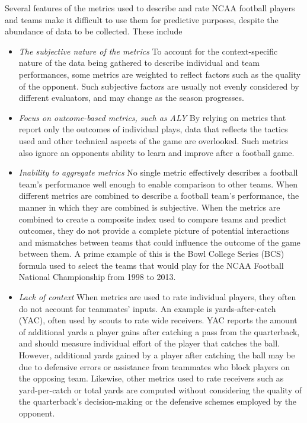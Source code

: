 \documentclass[sigconf]{acmart}
\begin{document}
Several features of the metrics used to describe and rate NCAA football players and teams make it difficult to use them for predictive purposes, despite the abundance of data to be collected. These include
\begin{itemize}
\item \textit{The subjective nature of the metrics}
\subitem To account for the context-specific nature of the data being gathered to describe individual and team performances, some metrics are weighted to reflect factors such as the quality of the opponent. Such subjective factors are usually not evenly considered by different evaluators, and may change as the season progresses.
\item \textit{Focus on outcome-based metrics, such as ALY}
\subitem By relying on metrics that report only the outcomes of individual plays, data that reflects the tactics used and other technical aspects of the game are overlooked. Such metrics also ignore an opponents ability to learn and improve after a football game.
\item \textit{Inability to aggregate metrics}
\subitem No single metric effectively describes a football team's performance well enough to enable comparison to other teams. When different metrics are combined to describe a football team's performance, the manner in which they are combined is subjective. When the  metrics are combined to create a composite index used to compare teams and predict outcomes, they do not provide a complete picture of potential interactions and mismatches between teams that could influence the outcome of the game between them. A prime example of this is the Bowl College Series (BCS) formula used to select the teams that would play for the NCAA Football National Championship from 1998 to 2013.
\item \textit{Lack of context}
\subitem When metrics are used to rate individual players, they often do not account for teammates' inputs. An example is yards-after-catch (YAC), often used by scouts to rate wide receivers. YAC reports the amount of additional yards a player gains after catching a pass from the quarterback, and should measure individual effort of the player that catches the ball. However, additional yards gained by a player after catching the ball may be due to defensive errors or assistance from teammates who block players on the opposing team. Likewise, other metrics used to rate receivers such as yard-per-catch or total yards are computed without considering the quality of the quarterback's decision-making or the defensive schemes employed by the opponent.
\end{itemize}
\end{document}

